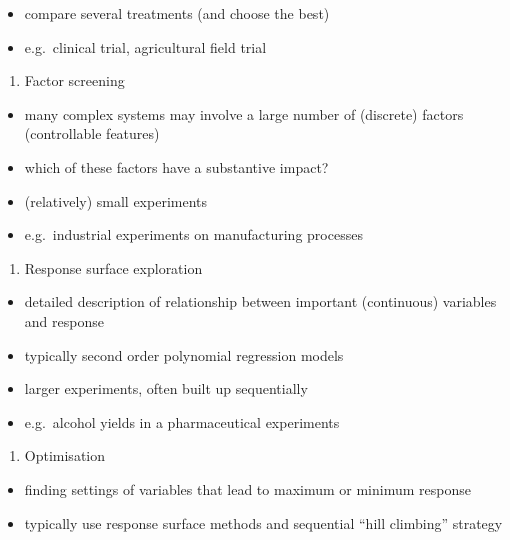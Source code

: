 \documentclass[
]{book}
\providecommand{\tightlist}{%
  \setlength{\itemsep}{0pt}\setlength{\parskip}{0pt}}
\theoremstyle{definition}
\theoremstyle{definition}
\theoremstyle{definition}
\theoremstyle{definition}
\theoremstyle{remark}
\begin{document}
\begin{itemize}
\tightlist
\item
  compare several treatments (and choose the best)
\item
  e.g.~clinical trial, agricultural field trial
\end{itemize}

\begin{enumerate}
\def\labelenumi{\arabic{enumi}.}
\setcounter{enumi}{1}
\tightlist
\item
  Factor screening
\end{enumerate}

\begin{itemize}
\tightlist
\item
  many complex systems may involve a large number of (discrete) factors (controllable features)
\item
  which of these factors have a substantive impact?
\item
  (relatively) small experiments
\item
  e.g.~industrial experiments on manufacturing processes
\end{itemize}

\begin{enumerate}
\def\labelenumi{\arabic{enumi}.}
\setcounter{enumi}{2}
\tightlist
\item
  Response surface exploration
\end{enumerate}

\begin{itemize}
\tightlist
\item
  detailed description of relationship between important (continuous) variables and response
\item
  typically second order polynomial regression models
\item
  larger experiments, often built up sequentially
\item
  e.g.~alcohol yields in a pharmaceutical experiments
\end{itemize}

\begin{enumerate}
\def\labelenumi{\arabic{enumi}.}
\setcounter{enumi}{3}
\tightlist
\item
  Optimisation
\end{enumerate}

\begin{itemize}
\tightlist
\item
  finding settings of variables that lead to maximum or minimum response
\item
  typically use response surface methods and sequential ``hill climbing'' strategy
\end{itemize}
\end{document}
